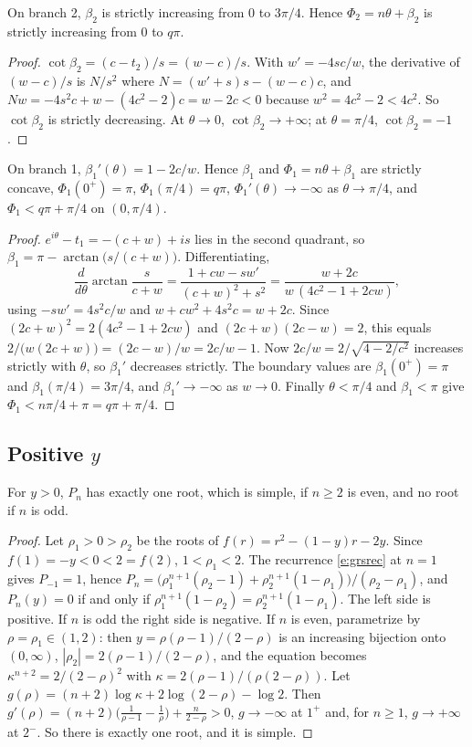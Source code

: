 \begin{lemma}\label{l:b2}
On branch 2, $\beta_2$ is strictly increasing from $0$ to $3\pi/4$. Hence $\Phi_2=n\theta+\beta_2$ is
strictly increasing from $0$ to $q\pi$.
\end{lemma}
\begin{proof}
$\cot\beta_2=(c-t_2)/s=(w-c)/s$. With $w'=-4sc/w$, the derivative of $(w-c)/s$ is $N/s^2$ where
$N=(w'+s)s-(w-c)c$, and $Nw=-4s^2c+w-(4c^2-2)c=w-2c<0$ because $w^2=4c^2-2<4c^2$. So $\cot\beta_2$ is
strictly decreasing. At $\theta\to0$, $\cot\beta_2\to+\infty$; at $\theta=\pi/4$, $\cot\beta_2=-1$.
\end{proof}

\begin{lemma}\label{l:b1}
On branch 1, $\beta_1'(\theta)=1-2c/w$. Hence $\beta_1$ and $\Phi_1=n\theta+\beta_1$ are strictly concave,
$\Phi_1(0^+)=\pi$, $\Phi_1(\pi/4)=q\pi$, $\Phi_1'(\theta)\to-\infty$ as $\theta\to\pi/4$, and
$\Phi_1<q\pi+\pi/4$ on $(0,\pi/4)$.
\end{lemma}
\begin{proof}
$e^{i\theta}-t_1=-(c+w)+is$ lies in the second quadrant, so $\beta_1=\pi-\arctan\bigl(s/(c+w)\bigr)$.
Differentiating,
\[
\frac{d}{d\theta}\arctan\frac{s}{c+w}=\frac{1+cw-sw'}{(c+w)^2+s^2}=\frac{w+2c}{w\,(4c^2-1+2cw)} ,
\]
using $-sw'=4s^2c/w$ and $w+cw^2+4s^2c=w+2c$. Since $(2c+w)^2=2(4c^2-1+2cw)$ and $(2c+w)(2c-w)=2$, this
equals $2/\bigl(w(2c+w)\bigr)=(2c-w)/w=2c/w-1$. Now $2c/w=2/\sqrt{4-2/c^2}$ increases strictly with $\theta$,
so $\beta_1'$ decreases strictly. The boundary values are $\beta_1(0^+)=\pi$ and $\beta_1(\pi/4)=3\pi/4$, and
$\beta_1'\to-\infty$ as $w\to0$. Finally $\theta<\pi/4$ and $\beta_1<\pi$ give $\Phi_1<n\pi/4+\pi=q\pi+\pi/4$.
\end{proof}

\subsection{Positive \texorpdfstring{$y$}{y}}
\begin{lemma}\label{l:pos}
For $y>0$, $P_n$ has exactly one root, which is simple, if $n\ge2$ is even, and no root if $n$ is odd.
\end{lemma}
\begin{proof}
Let $\rho_1>0>\rho_2$ be the roots of $f(r)=r^2-(1-y)r-2y$. Since $f(1)=-y<0<2=f(2)$, $1<\rho_1<2$. The
recurrence \eqref{e:grsrec} at $n=1$ gives $P_{-1}=1$, hence
$P_n=\bigl(\rho_1^{n+1}(\rho_2-1)+\rho_2^{n+1}(1-\rho_1)\bigr)/(\rho_2-\rho_1)$, and $P_n(y)=0$ if and only if
$\rho_1^{n+1}(1-\rho_2)=\rho_2^{n+1}(1-\rho_1)$. The left side is positive. If $n$ is odd the right side is
negative. If $n$ is even, parametrize by $\rho=\rho_1\in(1,2)$: then $y=\rho(\rho-1)/(2-\rho)$ is an increasing
bijection onto $(0,\infty)$, $|\rho_2|=2(\rho-1)/(2-\rho)$, and the equation becomes
$\kappa^{n+2}=2/(2-\rho)^2$ with $\kappa=2(\rho-1)/(\rho(2-\rho))$. Let
$g(\rho)=(n+2)\log\kappa+2\log(2-\rho)-\log2$. Then
$g'(\rho)=(n+2)\bigl(\tfrac1{\rho-1}-\tfrac1\rho\bigr)+\tfrac{n}{2-\rho}>0$, $g\to-\infty$ at $1^+$ and, for
$n\ge1$, $g\to+\infty$ at $2^-$. So there is exactly one root, and it is simple.
\end{proof}

